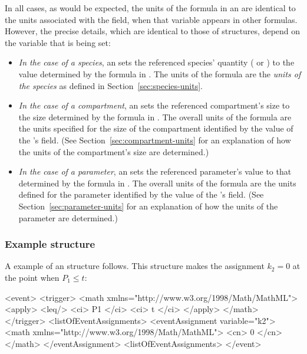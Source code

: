 In all cases, as would be expected, the units of the formula in an
\EventAssignment are identical to the units associated with the
 field, when that variable appears in other
formulas. However, the precise details, which are identical to
those of \AssignmentRule structures, depend on the variable that
is being set:
\begin{itemize}
  
\item \emph{In the case of a species}, an \EventAssignment sets
  the referenced species' quantity ( or
  ) to the value determined by the
  formula in .  The units of the formula are the
  \emph{units of the species} as defined in
  Section~\ref{sec:species-units}.
  
\item \emph{In the case of a compartment}, an \EventAssignment
  sets the referenced compartment's size to the size determined by
  the formula in .  The overall units of the formula
  are the units specified for the size of the compartment
  identified by the value of the \EventAssignment's
   field.  (See
  Section~\ref{sec:compartment-units} for an explanation of how
  the units of the compartment's size are determined.)
  
\item \emph{In the case of a parameter}, an \EventAssignment sets
  the referenced parameter's value to that determined by the
  formula in .  The overall units of the formula are
  the units defined for the parameter identified by the value of
  the \EventAssignment's  field.  (See
  Section~\ref{sec:parameter-units} for an explanation of how the
  units of the parameter are determined.)

\end{itemize}


\subsubsection{Example  structure}

A example of an \Event structure follows.  This structure makes the
assignment $k_2 = 0$ at the point when $P_1 \leq t$:

\begin{example}
<event>
    <trigger>
        <math xmlns="http://www.w3.org/1998/Math/MathML">
            <apply>
                <leq/>
                <ci> P1 </ci>
                <ci> t </ci>
            </apply>
        </math>
    </trigger>
    <listOfEventAssignments>
        <eventAssignment variable="k2">
            <math xmlns="http://www.w3.org/1998/Math/MathML">
                <cn> 0 </cn>
            </math>
        </eventAssignment>
    <listOfEventAssignments>
</event>
\end{example}

